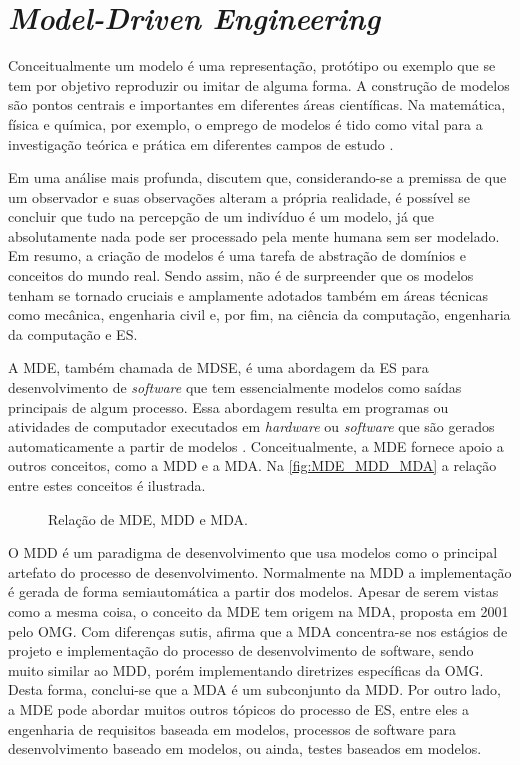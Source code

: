 \section{\textit{Model-Driven Engineering}} \label{ssec:MDE}

Conceitualmente um modelo é uma representação, protótipo ou exemplo que se tem por objetivo reproduzir ou imitar de alguma forma. 
A construção de modelos são pontos centrais e importantes em diferentes áreas científicas. 
Na matemática, física e química, por exemplo, o emprego de modelos é tido como vital para a investigação teórica e prática em diferentes campos de estudo \cite{Bailer:2009}.

Em uma análise mais profunda,  discutem que, considerando-se a premissa de que um observador e suas observações alteram a própria realidade, é possível se concluir que tudo na percepção de um indivíduo é um modelo, já que absolutamente nada pode ser processado pela mente humana sem ser modelado. 
Em resumo, a criação de modelos é uma tarefa de abstração de domínios e conceitos do mundo real. %
Sendo assim, não é de surpreender que os modelos tenham se tornado cruciais e amplamente adotados também em áreas técnicas como mecânica, engenharia civil e, por fim, na ciência da computação, engenharia da computação e \ac{ES}.

A \ac{MDE}, também chamada de \ac{MDSE}, é uma abordagem da \ac{ES} para desenvolvimento de \textit{software} que tem essencialmente modelos como saídas principais de algum processo. 
Essa abordagem resulta em programas ou atividades de computador executados em \textit{hardware} ou \textit{software} que são gerados automaticamente a partir de modelos \cite{Sommerville:2011}. 
Conceitualmente, a \ac{MDE} fornece apoio a outros conceitos, como a \ac{MDD} e a \ac{MDA}. Na \autoref{fig:MDE_MDD_MDA} a relação entre estes conceitos é ilustrada.

\begin{figure}[!htb]
    \centering
    \caption{Relação de MDE, MDD e MDA.}
    \label{fig:MDE_MDD_MDA}
    
\end{figure}

O \ac{MDD} é um paradigma de desenvolvimento que usa modelos como o principal artefato do processo de desenvolvimento. 
Normalmente na \ac{MDD} a implementação é gerada de forma semiautomática a partir dos modelos. 
Apesar de serem vistas como a mesma coisa, o conceito da \ac{MDE} tem origem na \ac{MDA}, proposta em 2001 pelo \ac{OMG}. 
Com diferenças sutis,  afirma que a \ac{MDA} concentra-se nos estágios de projeto e implementação do processo de desenvolvimento de software, sendo muito similar ao \ac{MDD}, porém implementando diretrizes específicas da \ac{OMG}. 
Desta forma, conclui-se que a \ac{MDA} é um subconjunto da \ac{MDD}. 
Por outro lado, a \ac{MDE} pode abordar muitos outros tópicos do processo de \ac{ES}, entre eles a engenharia de requisitos baseada em modelos, processos de software para desenvolvimento baseado em modelos, ou ainda, testes baseados em modelos.

